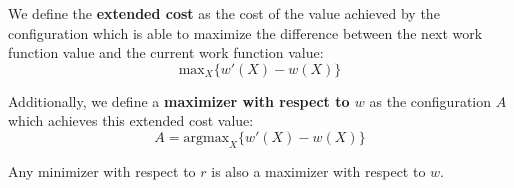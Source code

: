 \begin{definition}
    We define the \textbf{extended cost} as the cost of the value achieved by the configuration which is able to maximize the difference between the next work function value and the current work function value:
    \begin{equation*}
        \mathrm{max}_X \{ w'(X) - w(X)\}
    \end{equation*}
\end{definition}

\begin{definition}
    Additionally, we define a \textbf{maximizer with respect to $w$} as the configuration $A$ which achieves this extended cost value:
    \begin{equation*}
        A = \mathrm{argmax}_X \{ w'(X) - w(X) \}
    \end{equation*}
\end{definition}

\begin{lemma}
    \label{lem:dual}
    Any minimizer with respect to $r$ is also a maximizer with respect to $w$.
\end{lemma}

